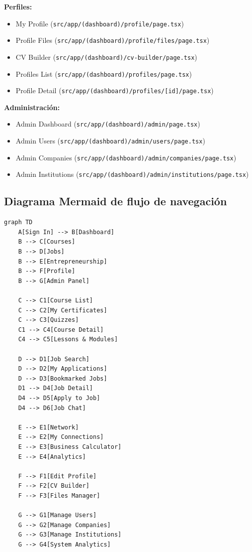 \documentclass[12pt,a4paper]{article}
\begin{document}
\begin{enumerate}
\textbf{Perfiles:}
\begin{itemize}
    \item My Profile (\texttt{src/app/(dashboard)/profile/page.tsx})
    \item Profile Files (\texttt{src/app/(dashboard)/profile/files/page.tsx})
    \item CV Builder (\texttt{src/app/(dashboard)/cv-builder/page.tsx})
    \item Profiles List (\texttt{src/app/(dashboard)/profiles/page.tsx})
    \item Profile Detail (\texttt{src/app/(dashboard)/profiles/[id]/page.tsx})
\end{itemize}

\textbf{Administración:}
\begin{itemize}
    \item Admin Dashboard (\texttt{src/app/(dashboard)/admin/page.tsx})
    \item Admin Users (\texttt{src/app/(dashboard)/admin/users/page.tsx})
    \item Admin Companies (\texttt{src/app/(dashboard)/admin/companies/page.tsx})
    \item Admin Institutions (\texttt{src/app/(dashboard)/admin/institutions/page.tsx})
\end{itemize}

\subsection{Diagrama Mermaid de flujo de navegación}

\begin{verbatim}
graph TD
    A[Sign In] --> B[Dashboard]
    B --> C[Courses]
    B --> D[Jobs]
    B --> E[Entrepreneurship]
    B --> F[Profile]
    B --> G[Admin Panel]

    C --> C1[Course List]
    C --> C2[My Certificates]
    C --> C3[Quizzes]
    C1 --> C4[Course Detail]
    C4 --> C5[Lessons & Modules]

    D --> D1[Job Search]
    D --> D2[My Applications]
    D --> D3[Bookmarked Jobs]
    D1 --> D4[Job Detail]
    D4 --> D5[Apply to Job]
    D4 --> D6[Job Chat]

    E --> E1[Network]
    E --> E2[My Connections]
    E --> E3[Business Calculator]
    E --> E4[Analytics]

    F --> F1[Edit Profile]
    F --> F2[CV Builder]
    F --> F3[Files Manager]

    G --> G1[Manage Users]
    G --> G2[Manage Companies]
    G --> G3[Manage Institutions]
    G --> G4[System Analytics]
\end{verbatim}


\end{enumerate}
\end{document}

